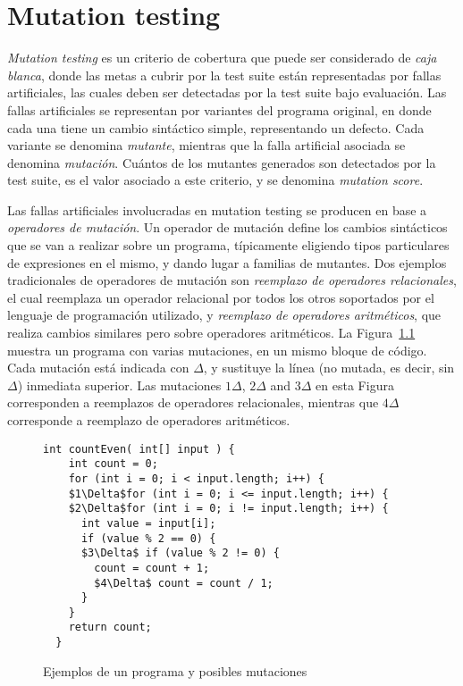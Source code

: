 \chapter[Mutation]{Mutation testing}
\label{cap:preliminares.mutation}

\emph{Mutation testing} es un criterio de cobertura que puede ser considerado de \emph{caja blanca}, donde las metas a cubrir por la test suite est\'an representadas por fallas artificiales, las cuales deben ser detectadas por la test suite bajo evaluaci\'on. Las fallas artificiales se representan por variantes del programa original, en donde cada una tiene un cambio sint\'actico simple, representando un defecto. Cada variante se denomina \emph{mutante}, mientras que la falla artificial asociada se denomina \emph{mutaci\'on}. Cu\'antos de los mutantes generados son detectados por la test suite, es el valor asociado a este criterio, y se denomina \emph{mutation score}.

Las fallas artificiales involucradas en mutation testing se producen en base a \emph{operadores de mutaci\'on}. Un operador de mutaci\'on define los cambios sint\'acticos que se van a realizar sobre un programa, t\'ipicamente eligiendo tipos particulares de expresiones en el mismo, y dando lugar a familias de mutantes. Dos ejemplos tradicionales de operadores de mutaci\'on son \emph{reemplazo de operadores relacionales}, el cual reemplaza un operador relacional por todos los otros soportados por el lenguaje de programaci\'on utilizado, y \emph{reemplazo de operadores aritm\'eticos}, que realiza cambios similares pero sobre operadores aritm\'eticos. La Figura~\ref{figures.examples.mutations} muestra un programa con varias mutaciones, en un mismo bloque de c\'odigo. Cada mutaci\'on est\'a indicada con $\Delta$, y sustituye la l\'inea (no mutada, es decir, sin $\Delta$) inmediata superior. Las mutaciones $1\Delta$, $2\Delta$ and $3\Delta$ en esta Figura corresponden a reemplazos de operadores relacionales, mientras que $4\Delta$ corresponde a reemplazo de operadores aritm\'eticos.

\begin{figure}[t]
	\begin{lstlisting}[frame=tlrb, mathescape=true]
  int countEven( int[] input ) {
    int count = 0;
    for (int i = 0; i < input.length; i++) {
    $1\Delta$for (int i = 0; i <= input.length; i++) {
    $2\Delta$for (int i = 0; i != input.length; i++) {
      int value = input[i];
      if (value % 2 == 0) {
      $3\Delta$ if (value % 2 != 0) {
        count = count + 1;
        $4\Delta$ count = count / 1;
      }
    }
    return count;
  }
	\end{lstlisting}
	\caption{Ejemplos de un programa y posibles mutaciones}
	\label{figures.examples.mutations}
\end{figure}

